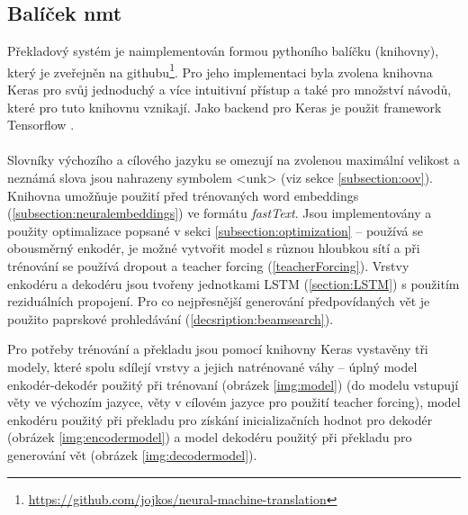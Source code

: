 \subsection{Balíček nmt}
Překladový systém je naimplementován formou pythoního balíčku (knihovny), který je zveřejněn na githubu\footnote{\url{https://github.com/jojkos/neural-machine-translation}}. Pro jeho implementaci byla zvolena knihovna Keras \cite{keras} pro svůj jednoduchý a více intuitivní přístup a také pro množství návodů, které pro tuto knihovnu vznikají. Jako backend pro Keras je použit framework Tensorflow \cite{tensorflow}.
\\\\
Slovníky výchozího a cílového jazyku se omezují na zvolenou maximální velikost a neznámá slova jsou nahrazeny symbolem <unk> (viz sekce \ref{subsection:oov}). Knihovna umožňuje použití před trénovaných word embeddings (\ref{subsection:neuralembeddings}) ve formátu \emph{fastText}. Jsou implementovány a použity optimalizace popsané v sekci \ref{subsection:optimization} -- používá se obousměrný enkodér, je možné vytvořit model s různou hloubkou sítí a při trénování se používá dropout a teacher forcing (\ref{teacherForcing}). Vrstvy enkodéru a dekodéru jsou tvořeny jednotkami LSTM (\ref{section:LSTM}) s použitím reziduálních propojení. Pro co nejpřesnější generování předpovídaných vět je použito paprskové prohledávání (\ref{decsription:beamsearch}).

Pro potřeby trénování a překladu jsou pomocí knihovny Keras vystavěny tři modely, které spolu sdílejí vrstvy a jejich natrénované váhy -- úplný model enkodér-dekodér použitý při trénovaní (obrázek \ref{img:model}) (do modelu vstupují věty ve výchozím jazyce, věty v cílovém jazyce pro použití teacher forcing), model enkodéru použitý při překladu pro získání inicializačních hodnot pro dekodér (obrázek \ref{img:encodermodel}) a model dekodéru použitý při překladu pro generování vět (obrázek \ref{img:decodermodel}).



